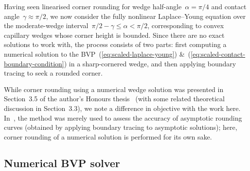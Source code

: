 Having seen linearised corner rounding
for wedge half-angle~$\alpha = \pi/4$
and contact angle~$\gamma \approx \pi/2$,
we now consider the fully nonlinear Laplace--Young equation
over the moderate-wedge interval~$\pi/2 - \gamma \le \alpha < \pi/2$,
corresponding to convex capillary wedges whose corner height is bounded.
Since there are no exact solutions to work with,
the process consists of two parts:
first computing a numerical solution
to the BVP~(\ref{eq:scaled-laplace-young})
\&~(\ref{eq:scaled-contact-boundary-condition})
in a sharp-cornered wedge,
and then applying boundary tracing to seek a rounded corner.

While corner rounding using a numerical wedge solution
was presented in Section~3.5
of the author's Honours thesis~\cite{li-2017-thesis-rounding-capillary-wedge}
(with some related theoretical discussion in Section~3.3),
we note a difference in objective with the work here.
In~\cite{li-2017-thesis-rounding-capillary-wedge},
the method was merely used
to assess the accuracy of asymptotic rounding curves
(obtained by applying boundary tracing to asymptotic solutions);
here, corner rounding of a numerical solution
is performed for its own sake.

\subsection{Numerical BVP solver}
\label{sec:moderate.nonlinear.numerical}

